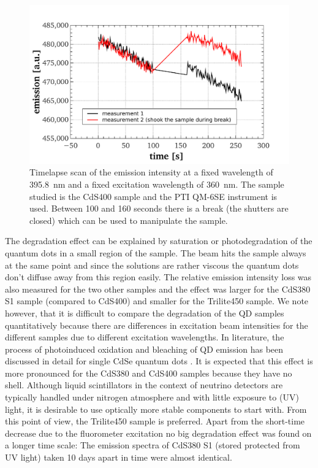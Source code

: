 \documentclass[cits]{JINST}
\begin{document}
\begin{figure}[tbh]
      \begin{center}
        \includegraphics[scale=0.39]{graphs/publication_7_timescan.pdf}
        \caption[]{Timelapse scan of the emission intensity at a fixed wavelength of 395.8~nm and a fixed excitation wavelength of 360~nm. The sample studied is the CdS400 sample and the PTI QM-6SE instrument is used. Between 100 and 160 seconds there is a break (the shutters are closed) which can be used to manipulate the sample. \label{time_scan}}
        \end{center}
\end{figure}

The degradation effect can be explained by saturation or photodegradation of the quantum dots in a small region of the sample. The beam hits the sample always at the same point and since the solutions are rather viscous the quantum dots don't diffuse away from this region easily. The relative emission intensity loss was also measured for the two other samples and the effect was larger for the CdS380 S1 sample (compared to CdS400) and smaller for the Trilite450 sample. We note however, that it is difficult to compare the degradation of the QD samples quantitatively because there are differences in excitation beam intensities for the different samples due to different excitation wavelengths. In literature, the process of photoinduced oxidation and bleaching of QD emission has been discussed in detail for single CdSe quantum dots \cite{vanSark}. It is expected that this effect is more pronounced for the CdS380 and CdS400 samples because they have no shell. Although liquid scintillators in the context of neutrino detectors are typically handled under nitrogen atmosphere and with little exposure to (UV) light, it is desirable to use optically more stable components to start with. From this point of view, the Trilite450 sample is preferred. Apart from the short-time decrease due to the fluorometer excitation no big degradation effect was found on a longer time scale: The emission spectra of CdS380 S1 (stored protected from UV light) taken 10 days apart in time were almost identical.
\end{document}
